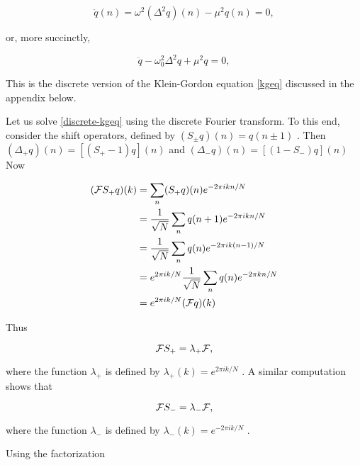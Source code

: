 \begin{equation}
\label{discrete-wave-equation2}
\ddot q(n) = \omega^2 (\Delta^2 q)(n) - \mu^2 q(n) = 0,
\end{equation}


or,  more  succinctly,



\begin{equation}
\label{discrete-kgeq}
\ddot q - \omega_0^2 \Delta^2 q + \mu^2 q = 0,
\end{equation}


This 
 is  the  discrete  version  of  the  Klein-Gordon  equation   \eqref{kgeq} discussed  in  the  appendix  below.



Let  us  solve   \eqref{discrete-kgeq} using  the  discrete  Fourier  transform.   To  this  end,  consider  the  shift  operators,  defined  by   $(S_{\pm}q)(n) = q(n\pm 1)$ .   Then   $(\Delta_+ q)(n)= [(S_+ - 1 )q](n)$  and    $(\Delta_- q)(n)= [(1 - S_-)q](n)$  Now



\begin{align}
(\mathcal{F} S_+q)(k) &= \sum_n  ( S_+ q )(n) e^{-2\pi i kn/N} \\
&= \frac{1}{\sqrt N} \sum_n q(n+1) e^{-2\pi i kn/N} \\
&= \frac{1}{\sqrt N} \sum_n q(n) e^{-2\pi i k(n-1)/N} \\
&= e^{2\pi i k/N} \frac{1}{\sqrt N}  \sum_n q(n) e^{-2\pi kn/N } \\
&=  e^{2\pi i k/N} (\mathcal{F} q)(k)
\end{align}


Thus



\begin{equation}
\mathcal{F} S_+ = \lambda_+\mathcal{F},
\end{equation}


where   the  function   $\lambda_+$  is  defined  by   $\lambda_+(k) =  e^{ 2\pi ik/N}$ .   A  similar  computation  shows  that



\begin{equation}
\mathcal{F} S_- = \lambda_-\mathcal{F},
\end{equation}


where   the  function   $\lambda_-$  is  defined  by   $\lambda_-(k) =  e^{- 2\pi ik/N}$ .



Using  the  factorization




